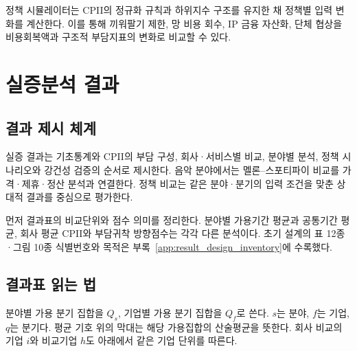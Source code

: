 \documentclass[11pt,a4paper]{report}
\begin{document}
정책 시뮬레이터는 CPII의 정규화 규칙과 하위지수 구조를 유지한 채 정책별 입력 변화를 계산한다. 이를 통해 끼워팔기 제한, 망 비용 회수, IP 금융 자산화, 단체 협상을 비용회복액과 구조적 부담지표의 변화로 비교할 수 있다.

\chapter{실증분석 결과}
\section{결과 제시 체계}
실증 결과는 기초통계와 CPII의 부담 구성, 회사·서비스별 비교, 분야별 분석, 정책 시나리오와 강건성 검증의 순서로 제시한다. 음악 분야에서는 멜론--스포티파이 비교를 가격·제휴·정산 분석과 연결한다. 정책 비교는 같은 분야·분기의 입력 조건을 맞춘 상대적 결과를 중심으로 평가한다.

먼저 결과표의 비교단위와 점수 의미를 정리한다. 분야별 가용기간 평균과 공통기간 평균, 회사 평균 CPII와 부담귀착 방향점수는 각각 다른 분석이다. 초기 설계의 표 12종·그림 10종 식별번호와 목적은 부록~\ref{app:result_design_inventory}에 수록했다.

\section{결과표 읽는 법}
분야별 가용 분기 집합을 \(Q_s\), 기업별 가용 분기 집합을 \(Q_f\)로 쓴다. \(s\)는 분야, \(f\)는 기업, \(q\)는 분기다. 평균 기호 위의 막대는 해당 가용집합의 산술평균을 뜻한다. 회사 비교의 기업 \(i\)와 비교기업 \(h\)도 아래에서 같은 기업 단위를 따른다.
\end{document}
